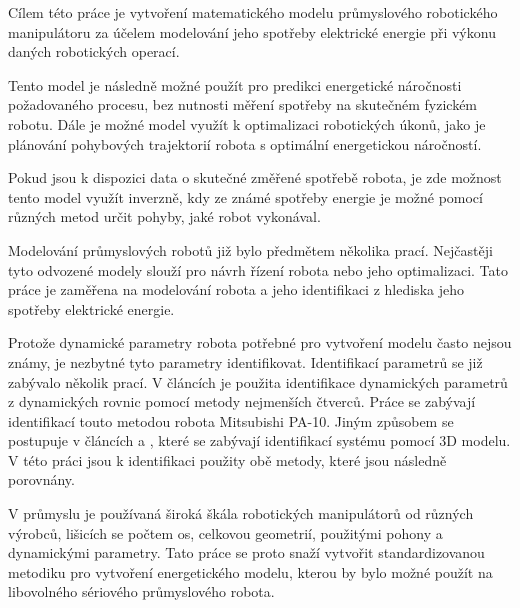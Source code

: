 Cílem této práce je vytvoření matematického modelu průmyslového robotického manipulátoru za účelem modelování jeho spotřeby elektrické energie při výkonu daných robotických operací. 

Tento model je následně možné použít pro predikci energetické náročnosti požadovaného procesu, bez nutnosti měření spotřeby na skutečném fyzickém robotu. Dále je možné model využít k optimalizaci robotických úkonů, jako je plánování pohybových trajektorií robota s optimální energetickou náročností. 

Pokud jsou k dispozici data o skutečné změřené spotřebě robota, je zde možnost tento model využít inverzně, kdy ze známé spotřeby energie je možné pomocí různých metod určit pohyby, jaké robot vykonával.

Modelování průmyslových robotů již bylo předmětem několika prací. Nejčastěji tyto odvozené modely slouží pro návrh řízení robota nebo jeho optimalizaci. Tato práce je zaměřena na modelování robota a jeho identifikaci z hlediska jeho spotřeby elektrické energie. 

Protože dynamické parametry robota potřebné pro vytvoření modelu často nejsou známy, je nezbytné tyto parametry identifikovat. Identifikací parametrů se již zabývalo několik prací. V článcích \cite{par_iden_rob}\cite{clos_dyn_par} je použita identifikace dynamických parametrů z dynamických rovnic pomocí metody nejmenších čtverců. Práce \cite{dyn_mod_ind}\cite{dyn_ind_mits} se zabývají identifikací touto metodou robota Mitsubishi PA-10. Jiným způsobem se postupuje v článcích \cite{dyn_ind_man} a \cite{akeel}, které se zabývají identifikací systému pomocí 3D modelu. V této práci jsou k identifikaci použity obě metody, které jsou následně porovnány.

V průmyslu je používaná široká škála robotických manipulátorů od různých výrobců, lišicích se počtem os, celkovou geometrií, použitými pohony a dynamickými parametry. Tato práce se proto snaží vytvořit standardizovanou metodiku pro vytvoření energetického modelu, kterou by bylo možné použít na libovolného sériového průmyslového robota.







